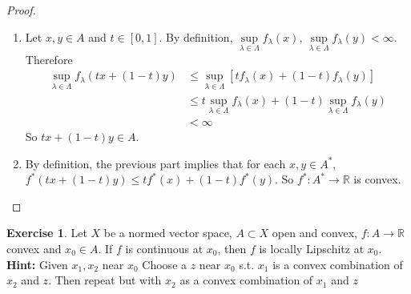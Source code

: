 \documentclass[12pt]{amsart}
\theoremstyle{definition}
\newtheorem{ex}[definition]{Exercise}
\newcommand{\lam}{\lambda}
\newcommand{\Lam}{\Lambda}
\newcommand{\R}{\mathbb{R}}
\newcommand{\tbf}[1]{\textbf{#1}}
\DeclareMathOperator*{\0}{\mbf{0}}
\DeclareMathOperator*{\1}{\mbf{1}}
\newcommand{\lex}[1]{\label{ex:#1}}
\begin{document}
	\begin{proof}
		\begin{enumerate}
			\item Let $x, y \in A$ and $t \in [0,1]$. By definition, $ \sup\limits_{\lam \in \Lam} f_{\lam}(x)$,  $\sup\limits_{\lam \in \Lam} f_{\lam}(y) < \infty$. Therefore 
			\begin{align*}
				 \sup\limits_{\lam \in \Lam} f_{\lam}(tx + (1-t)y) 
				&\leq \sup\limits_{\lam \in \Lam} [tf_{\lam}(x) + (1-t)f_{\lam}(y) ]  \\
				& \leq t \sup\limits_{\lam \in \Lam} f_{\lam}(x) + (1-t) \sup\limits_{\lam \in \Lam} f_{\lam}(y) \\
				& < \infty
			\end{align*}
			So $tx + (1-t)y \in A$.
			\item  By definition, the previous part implies that for each $x,y \in A^*$, $f^*(tx + (1-t)y) \leq t f^*(x) + (1-t)f^*(y)$. So $f^*:A^* \rightarrow \R$ is convex.
		\end{enumerate}
	\end{proof}
	
	
	
	
	\begin{ex} \lex{91016}
	Let $X$ be a normed vector space, $A \subset X$ open and convex, $f:A \rightarrow \R$ convex and $x_0 \in A$. If $f$ is continuous at $x_0$, then $f$ is locally Lipschitz at $x_0$. \\
	\tbf{Hint:} Given $x_1, x_2$ near $x_0$ Choose a $z$ near $x_0$ s.t. $x_1$ is a convex combination of $x_2$ and $z$. Then repeat but with $x_2$ as a convex combination of $x_1$ and $z$
	\end{ex}
	
\end{document}
